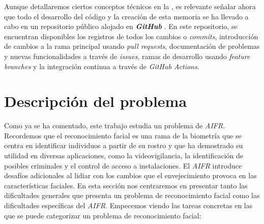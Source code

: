 Aunque detallaremos ciertos conceptos técnicos en la , es relevante señalar ahora que todo el desarrollo del código y la creación de esta memoria se ha llevado a cabo en un repositorio público alojado en \textbf{\textit{GitHub}} \cite{informatica:repogithub}. En este repositorio, se encuentran disponibles los registros de todos los cambios o \textit{commits}, introducción de cambios a la rama principal usando \textit{pull requests}, documentación de problemas y nuevas funcionalidades a través de \textit{issues}, ramas de desarrollo usando \textit{feature branches} y la integración continua a través de \textit{GitHub Actions}.

\section{Descripción del problema} \label{ich:descrp_problema}

Como ya se ha comentado, este trabajo estudia un problema de \textit{AIFR}. Recordemos que el reconocimiento facial es una rama de la biometría que se centra en identificar individuos a partir de su rostro y que ha demostrado su utilidad en diversas aplicaciones, como la videovigilancia, la identificación de posibles criminales y el control de acceso a instalaciones. El \textit{AIFR} introduce desafíos adicionales al lidiar con los cambios que el envejecimiento provoca en las características faciales. En esta sección nos centraremos en presentar tanto las dificultades generales que presenta un problema de reconocimiento facial como las dificultades específicas del \textit{AIFR}. Empecemos viendo las tareas concretas en las que se puede categorizar un problema de reconocimiento facial:

